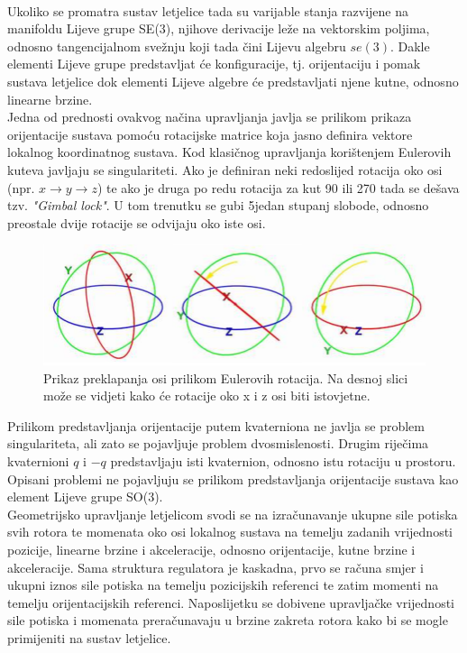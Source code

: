 \documentclass[times, utf8, diplomski]{fer}
\begin{document}
	\paragraph{}Ukoliko se promatra sustav letjelice tada su varijable stanja razvijene na manifoldu Lijeve grupe SE(3), njihove derivacije leže na vektorskim poljima, odnosno tangencijalnom svežnju koji tada čini Lijevu algebru $se(3)$. Dakle elementi Lijeve grupe predstavljat će konfiguracije, tj. orijentaciju i pomak sustava letjelice dok elementi Lijeve algebre će predstavljati njene kutne, odnosno linearne brzine. \\
	Jedna od prednosti ovakvog načina upravljanja javlja se prilikom prikaza orijentacije sustava pomoću rotacijske matrice koja jasno definira vektore lokalnog koordinatnog sustava. Kod klasičnog upravljanja korištenjem Eulerovih kuteva javljaju se singulariteti. Ako je definiran neki redoslijed rotacija oko osi (npr. $x \rightarrow y \rightarrow z$) te ako je druga po redu rotacija za kut 90 ili 270 tada se dešava tzv. \textit{"Gimbal lock"}. U tom trenutku se gubi 5jedan stupanj slobode, odnosno preostale dvije rotacije se odvijaju oko iste osi.
	
	\begin{figure}[h!]
		\includegraphics[width=\textwidth]{gimbal_lock.png}
		\caption{Prikaz preklapanja osi prilikom Eulerovih rotacija. Na desnoj slici može se vidjeti kako će rotacije oko x i z osi biti istovjetne.}
	\end{figure}
	
	\noindent Prilikom predstavljanja orijentacije putem kvaterniona ne javlja se problem singulariteta, ali zato se pojavljuje problem dvosmislenosti. Drugim riječima kvaternioni $q$ i $-q$ predstavljaju isti kvaternion, odnosno istu rotaciju u prostoru. Opisani problemi ne pojavljuju se prilikom predstavljanja orijentacije sustava kao element Lijeve grupe SO(3). \\
	Geometrijsko upravljanje letjelicom svodi se na izračunavanje ukupne sile potiska svih rotora te momenata oko osi lokalnog sustava na temelju zadanih vrijednosti pozicije, linearne brzine i akceleracije, odnosno orijentacije, kutne brzine i akceleracije. Sama struktura regulatora je kaskadna, prvo se računa smjer i ukupni iznos sile potiska na temelju pozicijskih referenci te zatim momenti na temelju orijentacijskih referenci. Naposlijetku se dobivene upravljačke vrijednosti sile potiska i momenata preračunavaju u brzine zakreta rotora kako bi se mogle primijeniti na sustav letjelice.
\end{document}
